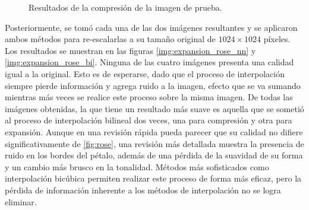 \documentclass[12pt]{article}
\begin{document}
\begin{figure}[htbp]
	\centering
	\quad
	\caption{Resultados de la compresión de la imagen de prueba.}
	\label{img:compresion_rose}
\end{figure}

\clearpage

Posteriormente, se tomó cada una de las dos imágenes resultantes y se aplicaron ambos métodos para re-escalarlas a su tamaño original de 
$1024\times1024$ píxeles. Los resultados se muestran en las figuras 
\ref{img:expansion_rose_nn} y \ref{img:expansion_rose_bi}. Ninguna de las cuatro imágenes presenta una calidad igual a la original. Esto es de esperarse, dado que el proceso de interpolación siempre pierde información y agrega ruido a la imagen, efecto que se va sumando mientras más veces se realice este proceso sobre la misma imagen. De todas las imágenes obtenidas, la que tiene un resultado más suave es aquella que se sometió al proceso de interpolación bilineal dos veces, una para compresión y otra para expansión. Aunque en una revisión rápida pueda parecer que su calidad no difiere significativamente de \ref{fig:rose}, una revisión más detallada muestra la presencia de ruido en los bordes del pétalo, además de una pérdida de la suavidad de su forma y un cambio más brusco en la tonalidad. Métodos más sofisticados como interpolación bicúbica permiten realizar este proceso de forma más eficaz, pero la pérdida de información inherente a los métodos de interpolación no se logra eliminar. 
\end{document}
